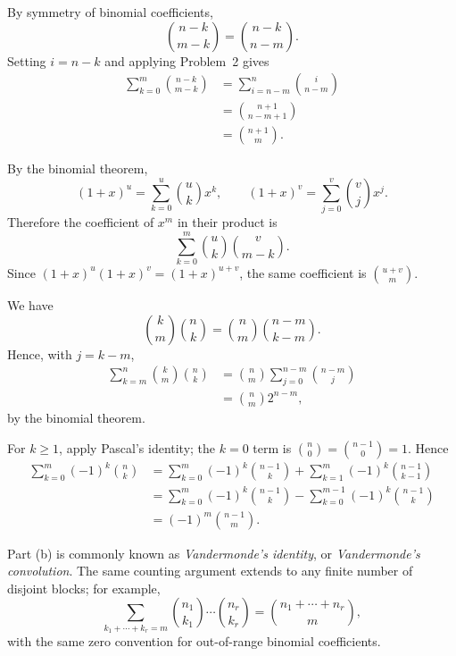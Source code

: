 \documentclass[11pt,oneside]{article}
\begin{document}
\begin{solution}[2]
\begin{problemsubparts}
    \item By symmetry of binomial coefficients,
    \[
        \binom{n-k}{m-k}=\binom{n-k}{n-m}.
    \]
    Setting $i=n-k$ and applying Problem~2 gives
    \[
    \begin{aligned}
        \sum_{k=0}^{m}\binom{n-k}{m-k}
        &=\sum_{i=n-m}^{n}\binom{i}{n-m}\\
        &=\binom{n+1}{n-m+1}\\
        &=\binom{n+1}{m}.
    \end{aligned}
    \]

    \item By the binomial theorem,
    \[
        (1+x)^u=\sum_{k=0}^{u}\binom{u}{k}x^k,
        \qquad
        (1+x)^v=\sum_{j=0}^{v}\binom{v}{j}x^j.
    \]
    Therefore the coefficient of $x^m$ in their product is
    \[
        \sum_{k=0}^{m}\binom{u}{k}\binom{v}{m-k}.
    \]
    Since $(1+x)^u(1+x)^v=(1+x)^{u+v}$, the same coefficient is $\binom{u+v}{m}$.

    \item We have
    \[
        \binom{k}{m}\binom{n}{k}
        =\binom{n}{m}\binom{n-m}{k-m}.
    \]
    Hence, with $j=k-m$,
    \[
    \begin{aligned}
        \sum_{k=m}^{n}\binom{k}{m}\binom{n}{k}
        &=\binom{n}{m}\sum_{j=0}^{n-m}\binom{n-m}{j}\\
        &=\binom{n}{m}2^{n-m},
    \end{aligned}
    \]
    by the binomial theorem.

    \item For $k\geq1$, apply Pascal's identity; the $k=0$ term is
    $\binom{n}{0}=\binom{n-1}{0}=1$. Hence
    \[
    \begin{aligned}
        \sum_{k=0}^{m}(-1)^k\binom{n}{k}
        &=\sum_{k=0}^{m}(-1)^k\binom{n-1}{k}
          +\sum_{k=1}^{m}(-1)^k\binom{n-1}{k-1}\\
        &=\sum_{k=0}^{m}(-1)^k\binom{n-1}{k}
          -\sum_{k=0}^{m-1}(-1)^k\binom{n-1}{k}\\
        &=(-1)^m\binom{n-1}{m}.
    \end{aligned}
    \]
\end{problemsubparts}
\end{solution}

\begin{remark}
Part (b) is commonly known as \emph{Vandermonde's identity}, or \emph{Vandermonde's convolution}. The same counting argument extends to any finite number of disjoint blocks; for example,
\[
    \sum_{k_1+\cdots+k_r=m}
    \binom{n_1}{k_1}\cdots\binom{n_r}{k_r}
    =\binom{n_1+\cdots+n_r}{m},
\]
with the same zero convention for out-of-range binomial coefficients.
\end{remark}
\end{document}
